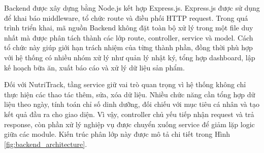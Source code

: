\documentclass[12pt, a4paper]{report}
\begin{document}
Backend được xây dựng bằng Node.js kết hợp Express.js. Express.js được sử dụng để khai báo middleware, tổ chức route và điều phối HTTP request. Trong quá trình triển khai, mã nguồn Backend không đặt toàn bộ xử lý trong một file duy nhất mà được phân tách thành các lớp route, controller, service và model. Cách tổ chức này giúp giới hạn trách nhiệm của từng thành phần, đồng thời phù hợp với hệ thống có nhiều nhóm xử lý như quản lý nhật ký, tổng hợp dashboard, lập kế hoạch bữa ăn, xuất báo cáo và xử lý dữ liệu sản phẩm.

Đối với NutriTrack, tầng service giữ vai trò quan trọng vì hệ thống không chỉ thực hiện các thao tác thêm, sửa, xóa dữ liệu. Nhiều chức năng cần tổng hợp dữ liệu theo ngày, tính toán chỉ số dinh dưỡng, đối chiếu với mục tiêu cá nhân và tạo kết quả đầu ra cho giao diện. Vì vậy, controller chủ yếu tiếp nhận request và trả response, còn phần xử lý nghiệp vụ được chuyển xuống service để giảm lặp logic giữa các module. Kiến trúc phân lớp này được mô tả chi tiết trong Hình \ref{fig:backend_architecture}.
\end{document}
